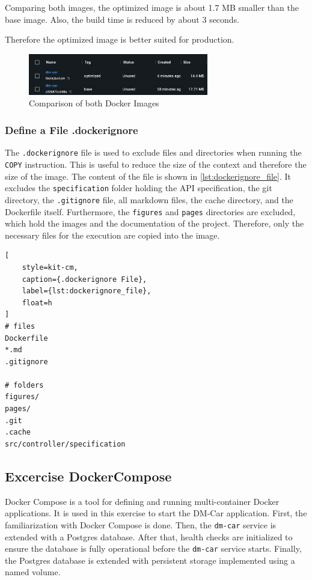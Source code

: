 Comparing both images, the optimized image is about 1.7 MB smaller than the base image.
Also, the build time is reduced by about 3 seconds.

Therefore the optimized image is better suited for production.

\begin{figure}
    \centering
    \includegraphics[width=0.7\textwidth]{figures/microservices/dmCar/ms_dmCar_optimizedComparison.png}
    \caption{Comparison of both Docker Images}
    \label{fig:docker_image_comparison}
\end{figure}

\subsubsection*{Define a File .dockerignore}
The \texttt{.dockerignore} file is used to exclude files and directories when running the \texttt{COPY} instruction.
This is useful to reduce the size of the context and therefore the size of the image.
The content of the file is shown in \autoref*{lst:dockerignore_file}.
It excludes the \texttt{specification} folder holding the API specification, the git directory, the \texttt{.gitignore} file, all markdown files, the cache directory, and the Dockerfile itself.
Furthermore, the \texttt{figures} and \texttt{pages} directories are excluded, which hold the images and the documentation of the project.
Therefore, only the necessary files for the execution are copied into the image.

\begin{lstlisting}[
    style=kit-cm,
    caption={.dockerignore File},
    label={lst:dockerignore_file},
    float=h
]
# files
Dockerfile
*.md
.gitignore

# folders
figures/
pages/
.git
.cache
src/controller/specification
\end{lstlisting}

\subsection{Excercise DockerCompose}
Docker Compose is a tool for defining and running multi-container Docker applications.
It is used in this exercise to start the DM-Car application.
First, the familiarization with Docker Compose is done.
Then, the \texttt{dm-car} service is extended with a Postgres database.
After that, health checks are initialized to ensure the database is fully operational before the \texttt{dm-car} service starts.
Finally, the Postgres database is extended with persistent storage implemented using a named volume.

